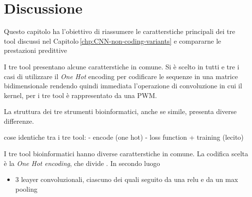 
\chapter{Discussione}\label{chp:discussion}

Questo capitolo ha l'obiettivo di riassumere le caratterstiche principali dei tre tool discussi nel Capitolo\,\ref{chp:CNN-non-coding-variants} e compararne le prestazioni predittive 

I tre tool presentano alcune caratterstiche in comune. Si è scelto in tutti e tre i casi di utilizzare il \textsl{One Hot} encoding per codificare le sequenze in una matrice bidimensionale rendendo quindi immediata l'operazione di convoluzione in cui il kernel, per i tre tool è rappresentato da una \acs{PWM}. 

La struttura dei tre strumenti bioinformatici, anche se simile, presenta diverse differenze. 




cose identiche tra i tre tool:
- encode (one hot)
- loss function + training (lecito)

I tre tool bioinformatici hanno diverse caratterstiche in comune. La codifica scelta è la \textsl{One Hot encoding}, che divide . In secondo luogo 

\begin{itemize}
    \item 3 leayer convoluzionali, ciascuno dei quali seguito da una relu e da un max pooling
\end{itemize}

